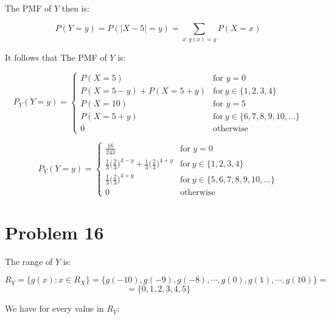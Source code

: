 \documentclass{article}
\begin{document}
The PMF of \(Y\) then is:

\begin{equation*}
    P(Y=y) = P(|X - 5| = y) = \sum_{x:g(x) = y}P(X=x)
\end{equation*}


It follows that The PMF of \(Y\) is:

\begin{equation*}
    P_{Y}(Y = y) =
    \begin{cases}
        P(X = 5)  & \mbox{for \(y = 0\)} \\
        P(X = 5 - y) + P(X = 5 + y)  & \mbox{for} \ y \in \{1, 2, 3, 4\} \\
        P(X = 10)  & \mbox{for \(y = 5\)} \\
        P(X = 5 + y)  & \mbox{for} \ y \in \{6, 7, 8, 9, 10, \dots\} \\
        0 & \mbox{otherwise} 
    \end{cases}
\end{equation*}

\begin{equation*}
    P_{Y}(Y = y) =
    \begin{cases}
        \frac{16}{243}  & \mbox{for \(y = 0\)} \\
        \frac{1}{3}\Big(\frac{2}{3}\Big)^{4-y} + \frac{1}{3}\Big(\frac{2}{3}\Big)^{4+y}  & \mbox{for} \ y \in \{1, 2, 3, 4\} \\
        \frac{1}{3}\Big(\frac{2}{3}\Big)^{4+y}  & \mbox{for} \ y \in \{5, 6, 7, 8, 9, 10, \dots\} \\
        0 & \mbox{otherwise} 
    \end{cases}
\end{equation*}

\section*{Problem 16}

The range of \(Y\) is:

\begin{equation*}
    R_{Y} = \{ g(x): x \in R_{X} \} = \{ g(-10), g(-9), g(-8), \cdots, g(0), g(1), \cdots, g(10) \} =
\end{equation*}
\begin{equation*}
    = \{0, 1, 2, 3, 4, 5\}
\end{equation*}

We have for every value in \(R_{Y}\):
\end{document}
